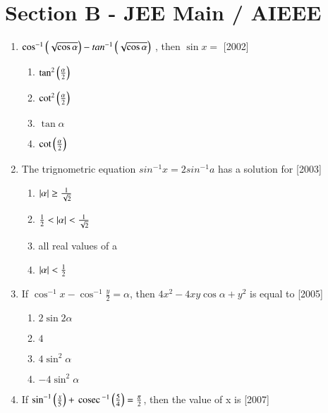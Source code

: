 \documentclass[journal,12pt,twocolumn]{IEEEtran}
\theoremstyle{remark}
\begin{document}
\section*{Section B - JEE Main / AIEEE}
\begin{enumerate}
	\item{
		$\cos^{-1}\left(\sqrt{\cos\alpha}\right)-tan^{-1}\left(\sqrt{\cos\alpha}\right)$ , then $\sin x =$ \hfill [2002]
		\begin{multicols}{2}
		\begin{enumerate}
			\item{$\tan^2 \left(\frac{\alpha}{2}\right)$}
			\item{$\cot^2 \left(\frac{\alpha}{2}\right)$}
			\columnbreak
			\item{$\tan\alpha$}
			\item{$\cot \left(\frac{\alpha}{2}\right)$}
		\end{enumerate}
		\end{multicols}
	}
	\item{
			The trignometric equation $sin^{-1} x = 2 sin^{-1}a$ has a solution for \hfill [2003]
		\begin{multicols}{2}
		\begin{enumerate}
			\item{$\left\vert\alpha\right\vert\geq\frac{1}{\sqrt{2}}$}
			\item{$\frac{1}{2} < \left\vert\alpha\right\vert < \frac{1}{\sqrt{2}}$}
			\columnbreak
			\item{all real values of a}
			\item{$\left\vert\alpha\right\vert < \frac{1}{2}$}
		\end{enumerate}
		\end{multicols}
	}
	\item{
			If $\cos^{-1}x - \cos^{-1}\frac{y}{2} = \alpha$, then $4x^2 - 4xy \cos \alpha + y^2$ is equal to \hfill [2005]
		\begin{multicols}{2}
		\begin{enumerate}
			\item{$2 \sin 2\alpha$}
			\item{$4 $}
			\columnbreak
			\item{$4 \sin^2 \alpha $}
			\item{$-4 \sin^2 \alpha $}
		\end{enumerate}
		\end{multicols}
	}
	\item{
			If $\sin^{-1} \left(\frac{x}{5}\right) + \,\text{cosec}\,^{-1}\left(\frac{5}{4}\right) = \frac{\pi}{2}$, then the value of x is \hfill [2007]
		\begin{multicols}{2}

\end{multicols}}
\end{enumerate}
\end{document}
